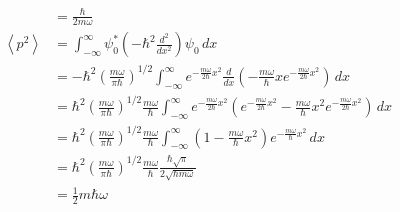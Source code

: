\documentclass{article}
\newcommand{\ev}[1]{\left< #1 \right>}
\begin{document}
\begin{enumerate}
\begin{align*}
                   & = \frac{\hbar}{2 m \omega}                                                                                                                                                                                                                                       \\
          \ev{p^2} & = \int_{-\infty}^\infty \psi_0^* \left( -\hbar^2 \frac{d^2}{d x^2} \right) \psi_0 \,d x                                                                                                                                                                          \\
                   & = -\hbar^2 \left( \frac{m \omega}{\pi \hbar} \right)^{1 / 2} \int_{-\infty}^\infty e^{-\frac{m \omega}{2 \hbar} x^2} \frac{d}{d x} \left( -\frac{m \omega}{\hbar} x e^{-\frac{m \omega}{2 \hbar} x^2} \right) \,d x                                              \\
                   & = \hbar^2 \left( \frac{m \omega}{\pi \hbar} \right)^{1 / 2} \frac{m \omega}{\hbar} \int_{-\infty}^\infty e^{-\frac{m \omega}{2 \hbar} x^2} \left( e^{-\frac{m \omega}{2 \hbar} x^2} - \frac{m \omega}{\hbar} x^2 e^{-\frac{m \omega}{2 \hbar} x^2} \right) \,d x \\
                   & = \hbar^2 \left( \frac{m \omega}{\pi \hbar} \right)^{1 / 2} \frac{m \omega}{\hbar} \int_{-\infty}^\infty \left( 1 - \frac{m \omega}{\hbar} x^2 \right) e^{-\frac{m \omega}{\hbar} x^2} \,d x                                                                     \\
                   & = \hbar^2 \left( \frac{m \omega}{\pi \hbar} \right)^{1 / 2} \frac{m \omega}{\hbar} \frac{\hbar \sqrt{\pi}}{2 \sqrt{\hbar m \omega}}                                                                                                                              \\
                   & = \frac{1}{2} m \hbar \omega
        \end{align*}


\end{enumerate}
\end{document}
